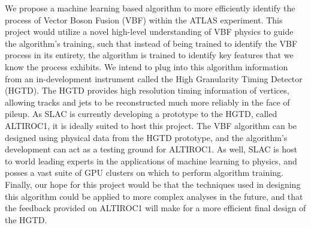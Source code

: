 \documentclass[paper=a4,fontsize=12pt]{article}
\begin{document}
We propose a machine learning based algorithm to more efficiently identify the process of Vector Boson Fusion (VBF) within the ATLAS experiment. This project would utilize a novel high-level understanding of VBF physics to guide the algorithm's training, such that instead of being trained to identify the VBF process in its entirety, the algorithm is trained to identify key features that we know the process exhibits. We intend to plug into this algorithm information from an in-development instrument called the High Granularity Timing Detector (HGTD). The HGTD provides high resolution timing information of vertices, allowing tracks and jets to be reconstructed much more reliably in the face of pileup. As SLAC is currently developing a prototype to the HGTD, called ALTIROC1, it is ideally suited to host this project. The VBF algorithm can be designed using physical data from the HGTD prototype, and the algorithm's development can act as a testing ground for ALTIROC1. As well, SLAC is host to world leading experts in the applications of machine learning to physics, and posses a vast suite of GPU clusters on which to perform algorithm training. Finally, our hope for this project would be that the techniques used in designing this algorithm could be applied to more complex analyses in the future, and that the feedback provided on ALTIROC1 will make for a more efficient final design of the HGTD.
\end{document}
